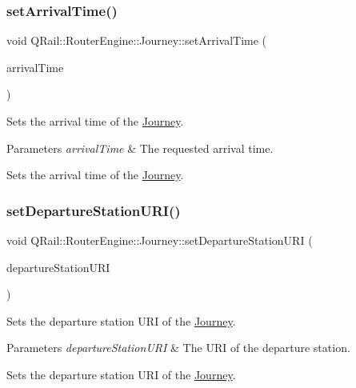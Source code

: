 \subsubsection{\texorpdfstring{setArrivalTime()}{setArrivalTime()}}
{\footnotesize\ttfamily void Q\+Rail\+::\+Router\+Engine\+::\+Journey\+::set\+Arrival\+Time (\begin{DoxyParamCaption}\item[{const Q\+Date\+Time \&}]{arrival\+Time }\end{DoxyParamCaption})}



Sets the arrival time of the \mbox{\hyperlink{classQRail_1_1RouterEngine_1_1Journey}{Journey}}. 


\begin{DoxyParams}{Parameters}
{\em arrival\+Time} & The requested arrival time.\\
\hline
\end{DoxyParams}
Sets the arrival time of the \mbox{\hyperlink{classQRail_1_1RouterEngine_1_1Journey}{Journey}}. \mbox{\label{classQRail_1_1RouterEngine_1_1Journey_a6001845dd7a206a719712a28a1c0a097}} 
\subsubsection{\texorpdfstring{setDepartureStationURI()}{setDepartureStationURI()}}
{\footnotesize\ttfamily void Q\+Rail\+::\+Router\+Engine\+::\+Journey\+::set\+Departure\+Station\+U\+RI (\begin{DoxyParamCaption}\item[{const Q\+Url \&}]{departure\+Station\+U\+RI }\end{DoxyParamCaption})}



Sets the departure station U\+RI of the \mbox{\hyperlink{classQRail_1_1RouterEngine_1_1Journey}{Journey}}. 


\begin{DoxyParams}{Parameters}
{\em departure\+Station\+U\+RI} & The U\+RI of the departure station.\\
\hline
\end{DoxyParams}
Sets the departure station U\+RI of the \mbox{\hyperlink{classQRail_1_1RouterEngine_1_1Journey}{Journey}}. \mbox{\label{classQRail_1_1RouterEngine_1_1Journey_a4a03bbbfcbdc80e1d040598959ae4743}} 
